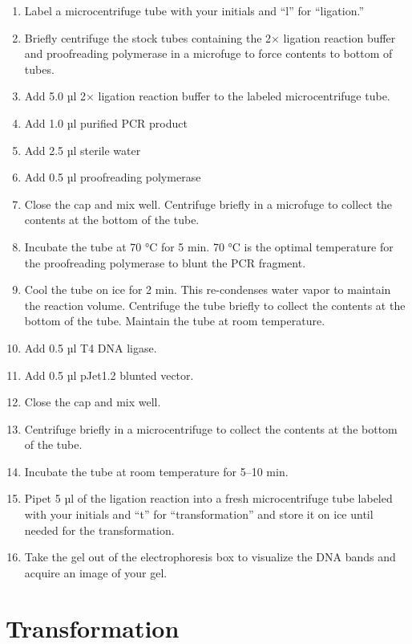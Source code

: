 \documentclass[]{book}
\providecommand{\tightlist}{%
  \setlength{\itemsep}{0pt}\setlength{\parskip}{0pt}}
\begin{document}
\begin{enumerate}
\def\labelenumi{\arabic{enumi}.}
\tightlist
\item
  Label a microcentrifuge tube with your initials and ``l'' for
  ``ligation.''
\item
  Briefly centrifuge the stock tubes containing the 2× ligation reaction
  buffer and proofreading polymerase in a microfuge to force contents to
  bottom of tubes.
\item
  Add 5.0 µl 2× ligation reaction buffer to the labeled microcentrifuge
  tube.
\item
  Add 1.0 µl purified PCR product
\item
  Add 2.5 µl sterile water
\item
  Add 0.5 µl proofreading polymerase
\item
  Close the cap and mix well. Centrifuge briefly in a microfuge to
  collect the contents at the bottom of the tube.
\item
  Incubate the tube at 70 °C for 5 min. 70 °C is the optimal temperature
  for the proofreading polymerase to blunt the PCR fragment.
\item
  Cool the tube on ice for 2 min. This re-condenses water vapor to
  maintain the reaction volume. Centrifuge the tube briefly to collect
  the contents at the bottom of the tube. Maintain the tube at room
  temperature.
\item
  Add 0.5 µl T4 DNA ligase.
\item
  Add 0.5 µl pJet1.2 blunted vector.
\item
  Close the cap and mix well.
\item
  Centrifuge briefly in a microcentrifuge to collect the contents at the
  bottom of the tube.
\item
  Incubate the tube at room temperature for 5--10 min.
\item
  Pipet 5 µl of the ligation reaction into a fresh microcentrifuge tube
  labeled with your initials and ``t'' for ``transformation'' and store
  it on ice until needed for the transformation.
\item
  Take the gel out of the electrophoresis box to visualize the DNA bands
  and acquire an image of your gel.
\end{enumerate}

\section{Transformation}\label{transformation}
\end{document}
